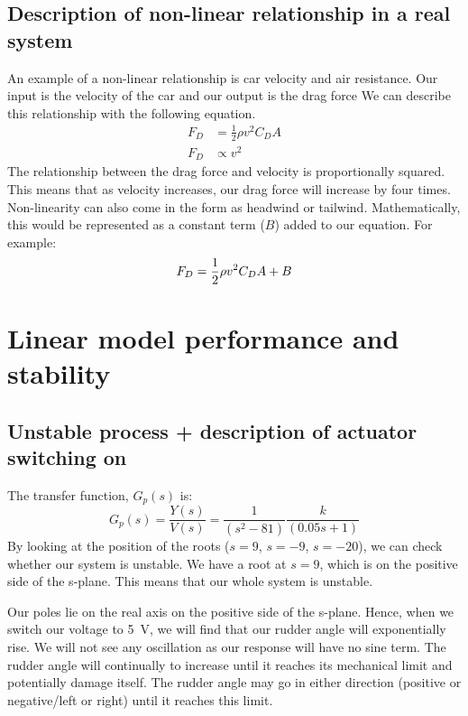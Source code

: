 \documentclass[11pt]{article}
\numberwithin{equation}{section}
\begin{document}
\subsection{Description of non-linear relationship in a real system}
An example of a non-linear relationship is car velocity and air resistance. Our input is the velocity of the car and our output is the drag force We can describe this relationship with the following equation.
\begin{align}
    F_D &= \frac{1}{2} \rho v^2 C_D A\\
    F_D &\propto v^2
\end{align}
The relationship between the drag force and velocity is proportionally squared. This means that as velocity increases, our drag force will increase by four times. Non-linearity can also come in the form as headwind or tailwind. Mathematically, this would be represented as a constant term ($B$) added to our equation. For example:
\begin{equation}
    F_D = \frac{1}{2} \rho v^2 C_D A + B\\
\end{equation}
\section{Linear model performance and stability}
\subsection{Unstable process + description of actuator switching on}
The transfer function, $G_p(s)$ is:
\begin{equation}
    G_p (s) = \frac{Y(s)}{V(s)} = \frac{1}{\left(s^2 - 81\right)}\frac{k}{\left(0.05s + 1\right)}
\end{equation}
By looking at the position of the roots ($s = 9$, $s = -9$, $s = -20$), we can check whether our system is unstable. We have a root at $s = 9$, which is on the positive side of the s-plane. This means that our whole system is unstable. 

Our poles lie on the real axis on the positive side of the s-plane. Hence, when we switch our voltage to \SI{5}{\volt}, we will find that our rudder angle will exponentially rise. We will not see any oscillation as our response will have no sine term. The rudder angle will continually to increase until it reaches its mechanical limit and potentially damage itself. The rudder angle may go in either direction (positive or negative/left or right) until it reaches this limit. 
\end{document}
